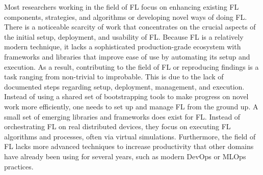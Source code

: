 Most researchers working in the field of FL focus on enhancing existing FL components, strategies, and algorithms or developing novel ways of doing FL.
There is a noticeable scarcity of work that concentrates on the crucial aspects of the initial setup, deployment, and usability of FL.
Because FL is a relatively modern technique, it lacks a sophisticated production-grade ecosystem with frameworks and libraries that improve ease of use by automating its setup and execution.
As a result, contributing to the field of FL or reproducing findings is a task ranging from non-trivial to improbable.
This is due to the lack of documented steps regarding setup, deployment, management, and execution.
Instead of using a shared set of bootstrapping tools to make progress on novel work more efficiently, one needs to set up and manage FL from the ground up.
A small set of emerging libraries and frameworks does exist for FL.
Instead of orchestrating FL on real distributed devices, they focus on executing FL algorithms and processes, often via virtual simulations. 
Furthermore, the field of FL lacks more advanced techniques to increase productivity that other domains have already been using for several years, such as modern DevOps or MLOps practices.